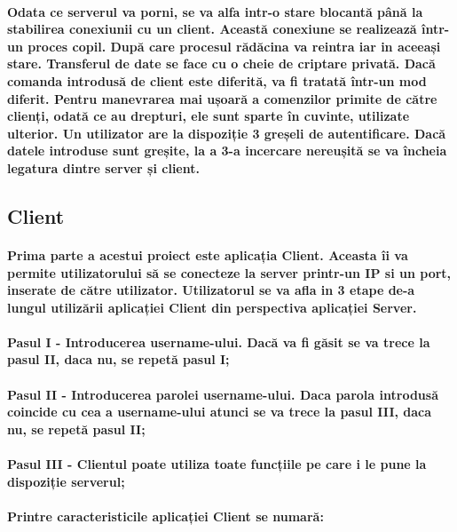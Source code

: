 \documentclass{article}
\begin{document}
	\paragraph{
	Odata ce serverul va porni, se va alfa intr-o stare blocantă până la stabilirea conexiunii cu un client. Această conexiune se realizează într-un proces copil. După care procesul rădăcina va reintra iar in aceeași stare. Transferul de date se face cu o cheie de criptare privată. Dacă comanda introdusă de client este diferită, va fi tratată într-un mod diferit. Pentru manevrarea mai ușoară a comenzilor primite de către clienți, odată ce au drepturi, ele sunt sparte în cuvinte, utilizate ulterior. Un utilizator are la dispoziție 3 greșeli de autentificare. Dacă datele introduse sunt greșite, la a 3-a incercare nereușită se va încheia legatura dintre server și client.
	}
	
	\subsection{Client}
	\paragraph{
		Prima parte a acestui proiect este aplicația Client. Aceasta îi va permite utilizatorului să se conecteze la server printr-un IP si un port, inserate de către utilizator. Utilizatorul se va afla in 3 etape de-a lungul utilizării aplicației Client din perspectiva aplicației Server.
	}
	\paragraph{Pasul I - Introducerea username-ului. Dacă va fi găsit se va trece la pasul II, daca nu, se repetă pasul I;}	
	\paragraph{Pasul II - Introducerea parolei username-ului. Daca parola introdusă coincide cu cea a username-ului atunci se va trece la pasul III, daca nu, se repetă pasul II;}
	\paragraph{Pasul III - Clientul poate utiliza toate funcțiile pe care i le pune la dispoziție serverul;}		
	
	
	\paragraph{
		Printre caracteristicile aplicației Client se numară:
	}
	
\end{document}
